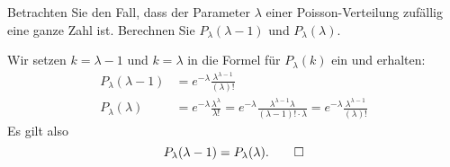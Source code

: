 Betrachten Sie den Fall, dass der Parameter $\lambda$ einer Poisson-Verteilung
zufällig eine ganze Zahl ist.
Berechnen Sie $P_\lambda(\lambda-1)$ und $P_\lambda(\lambda)$.


\begin{loesung}
Wir setzen $k=\lambda-1$ und $k=\lambda$ in die Formel für $P_\lambda(k)$ ein
und erhalten:
\begin{align*}
P_\lambda(\lambda-1)
&=
e^{-\lambda}\frac{\lambda^{\lambda -1 }}{(\lambda)!}
\\
P_\lambda(\lambda)
&=
e^{-\lambda}\frac{\lambda^{\lambda}}{\lambda!}
=
e^{-\lambda}\frac{\lambda^{\lambda-1}\lambda}{(\lambda-1)!\cdot\lambda}
=
e^{-\lambda}\frac{\lambda^{\lambda -1 }}{(\lambda)!}
\end{align*}
Es gilt also
\[
P_\lambda(\lambda -1)=P_\lambda(\lambda).
\qedhere
\]
\end{loesung}

